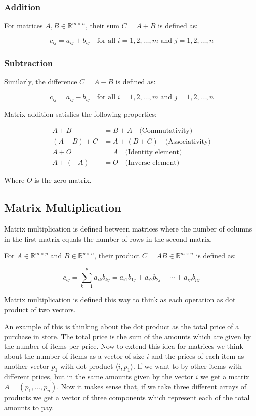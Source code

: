 \subsubsection*{Addition}

For matrices \(A, B \in \mathbb{R}^{m \times n}\), their sum \(C = A + B\) is defined as:

\[
c_{ij} = a_{ij} + b_{ij} \quad \text{for all } i = 1, 2, \ldots, m \text{ and } j = 1, 2, \ldots, n
\]

\subsubsection*{Subtraction}

Similarly, the difference \(C = A - B\) is defined as:

\[
c_{ij} = a_{ij} - b_{ij} \quad \text{for all } i = 1, 2, \ldots, m \text{ and } j = 1, 2, \ldots, n
\]

Matrix addition satisfies the following properties:

\begin{align*}
A + B &= B + A \quad \text{(Commutativity)} \\
(A + B) + C &= A + (B + C) \quad \text{(Associativity)} \\
A + O &= A \quad \text{(Identity element)} \\
A + (-A) &= O \quad \text{(Inverse element)}
\end{align*}

Where \(O\) is the zero matrix.

\subsection{Matrix Multiplication}

Matrix multiplication is defined between matrices where the number of columns in the first 
matrix equals the number of rows in the second matrix.

For \(A \in \mathbb{R}^{m \times p}\) and \(B \in \mathbb{R}^{p \times n}\), their product \(C = AB \in \mathbb{R}^{m \times n}\) is defined as:

\[
c_{ij} = \sum_{k=1}^{p} a_{ik}b_{kj} = a_{i1}b_{1j} + a_{i2}b_{2j} + \cdots + a_{ip}b_{pj}
\]

Matrix multiplication is defined this way to think as each operation as dot product of two vectors.
\vspace{\baselineskip}

An example of this is thinking about the dot product as the total price of a purchase in store. 
The total price is the sum of the amounts which are given by the number of items per price. Now to extend this idea 
for matrices we think about the number of items as a vector of size \(i\) and the prices of each item as 
another vector \(p_1\) with dot product \(\langle i, p_1 \rangle\). If we want to by other items with different prices, but in the 
same amounts given by the vector \(i\) we get a matrix \(A = (p_1, \dots, p_n)\). Now it makes sense that, if 
we take three different arrays of products we get a vector of three components which represent each of the 
total amounts to pay.
\vspace{\baselineskip}

